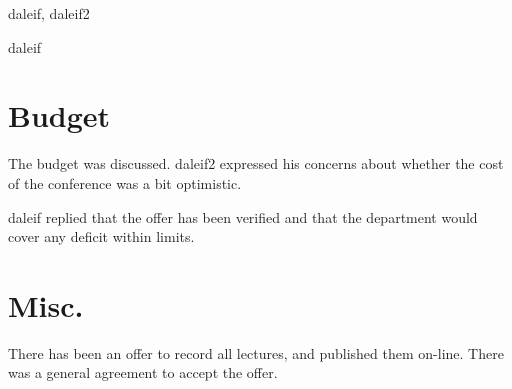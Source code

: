 \documentclass[english,unit=imfau]{aultrdesign}
\begin{document}
\begin{ColophonData}
\end{ColophonData}

\begin{InformationArea}
  \begin{present}
    daleif, daleif2
  \end{present}
  \begin{absent}
    daleif
  \end{absent}
\end{InformationArea}


\begin{minutes}


\section{Budget}

The budget was discussed. daleif2 expressed his concerns about whether
the cost of the conference was a bit optimistic.

daleif replied that the offer has been verified and that the
department would cover any deficit within limits.


\section{Misc.}

There has been an offer to record all lectures, and published them
on-line. There was a general agreement to accept the offer.


\closing{}

\end{minutes}
\end{document}
